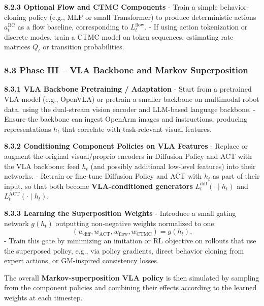 \documentclass[
]{article}
\theoremstyle{remark}
\begin{document}
\textbf{8.2.3 Optional Flow and CTMC Components} - Train a simple
behavior-cloning policy (e.g., MLP or small Transformer) to produce
deterministic actions \(a_t^{\text{BC}}\) as a flow baseline,
corresponding to \(L_t^{\text{flow}}\). \cite{lecnotes2026,gm-companion-notes} - If using
action tokenization or discrete modes, train a CTMC model on token
sequences, estimating rate matrices \(Q_t\) or transition
probabilities. \cite{lecnotes2026,gm2025,openvla-notes}

\subsubsection{8.3 Phase III -- VLA Backbone and Markov
Superposition}\label{phase-iii-vla-backbone-and-markov-superposition}

\textbf{8.3.1 VLA Backbone Pretraining / Adaptation} - Start from a
pretrained VLA model (e.g., OpenVLA) or pretrain a smaller backbone on
multimodal robot data, using the dual-stream vision encoder and
LLM-based language backbone. \cite{openvla-notes} - Ensure the backbone can
ingest OpenArm images and instructions, producing representations
\(h_t\) that correlate with task-relevant visual features. \cite{openvla-notes}

\textbf{8.3.2 Conditioning Component Policies on VLA Features} - Replace
or augment the original visual/proprio encoders in Diffusion Policy and
ACT with the VLA backbone: feed \(h_t\) (and possibly additional
low-level features) into their
networks. \cite{diffpolicy-theory-notes,act-openarm-notes,openvla-notes} - Retrain or fine-tune
Diffusion Policy and ACT with \(h_t\) as part of their input, so that
both become \textbf{VLA-conditioned generators}
\(L_t^{\text{diff}}(\cdot \mid h_t)\) and
\(L_t^{\text{ACT}}(\cdot \mid h_t)\). \cite{diffpolicy-theory-notes,act-openarm-notes,openvla-notes}

\textbf{8.3.3 Learning the Superposition Weights} - Introduce a small
gating network \(g(h_t)\) outputting non-negative weights normalized to
one: \[
  (w_{\text{diff}}, w_{\text{ACT}}, w_{\text{flow}}, w_{\text{CTMC}}) = g(h_t).
  \] - Train this gate by minimizing an imitation or RL objective on
rollouts that use the superposed policy, e.g., via policy gradients,
direct behavior cloning from expert actions, or GM-inspired consistency
losses. \cite{gm2025,openvla-notes}

The overall \textbf{Markov-superposition VLA policy} is then simulated
by sampling from the component policies and combining their effects
according to the learned weights at each
timestep. \cite{act-openarm-notes,diffpolicy-theory-notes,gm2025}
\end{document}

